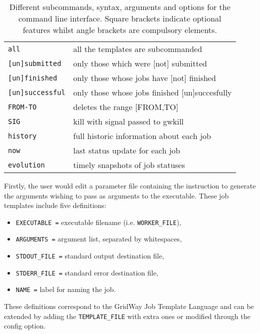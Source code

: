 \documentclass[12pt,a4paper]{article}
\begin{document}
\begin{table}[!th]
\begin{tabular}{ll}
{\tt all} &               all the templates are subcommanded\\
{\tt [un]submitted} &     only those which were [not] submitted\\
{\tt [un]finished} &      only those whose jobs have [not] finished\\
{\tt [un]successful} &    only those whose jobs finished [un]succesfully\\
{\tt FROM-TO} &           deletes the range [FROM,TO]\\
{\tt SIG} &               kill with signal passed to gwkill\\
{\tt history} &           full historic information about each job\\
{\tt now} &               last status update for each job\\
{\tt evolution} &         timely snapshots of job statuses\\
\hline
\end{tabular}
\caption{Different subcommands, syntax, arguments and options for the command line interface. Square brackets indicate optional features whilst angle brackets are compulsory elements.}
\label{usagetable}
\end{table}

Firstly, the user would edit a parameter file containing the instruction to generate the arguments wishing to pass as arguments to the executable. These job templates include five definitions:
\begin{itemize}
\item {\tt EXECUTABLE =} executable filename (i.e. {\tt WORKER\_FILE}),
\item {\tt ARGUMENTS =} argument list, separated by whitespaces,
\item {\tt STDOUT\_FILE =} standard output destination file,
\item {\tt STDERR\_FILE =} standard error destination file,
\item {\tt NAME =} label for naming the job.
\end{itemize}

These definitions correspond to the GridWay Job Template Language and can be extended by adding the {\tt TEMPLATE\_FILE} with extra ones or modified through the config option.
\end{document}
